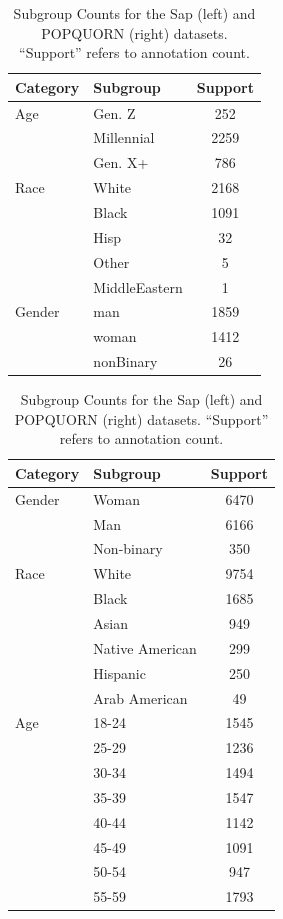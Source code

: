 \documentclass[manuscript,screen,review,anonymous]{acmart}
\theoremstyle{acmplain}
\theoremstyle{researchquestionstyle}
\begin{document}
\begin{table}[t]
	\caption{Subgroup Counts for the Sap (left) and POPQUORN (right) datasets. ``Support'' refers to annotation count.}
	\label{tab:sap-stats}
	\centering
	\begin{minipage}[t]{0.45\linewidth}
		\begin{tabular}{llc}
			\toprule
			\textbf{Category} & \textbf{Subgroup} & \textbf{Support}\\
			\midrule
			Age& Gen. Z & 252 \\
			& Millennial & 2259 \\
			& Gen. X+ & 786 \\
			\midrule
			Race & White & 2168 \\
			& Black & 1091 \\
			& Hisp & 32 \\
			& Other & 5 \\
			& MiddleEastern & 1 \\
			\midrule
			Gender & man & 1859 \\
			& woman & 1412 \\
			& nonBinary & 26 \\
			\bottomrule
		\end{tabular}
	\end{minipage}
	\begin{minipage}[t]{0.485\linewidth}
		\begin{tabular}{llc}
			\toprule
			\textbf{Category} & \textbf{Subgroup} & \textbf{Support}\\
			\midrule
			Gender & Woman & 6470 \\
			& Man & 6166 \\
			& Non-binary & 350 \\
			\midrule
			Race & White & 9754 \\
			& Black & 1685 \\
			& Asian & 949 \\
			& Native American & 299 \\
			& Hispanic & 250 \\
			& Arab American & 49 \\
			\midrule
			Age & 18-24 & 1545 \\
			& 25-29 & 1236 \\
			& 30-34 & 1494 \\
			& 35-39 & 1547 \\
			& 40-44 & 1142 \\
			& 45-49 & 1091 \\
			& 50-54 & 947 \\
			& 55-59 & 1793 \\


\end{tabular}
\end{minipage}
\end{table}
\end{document}
